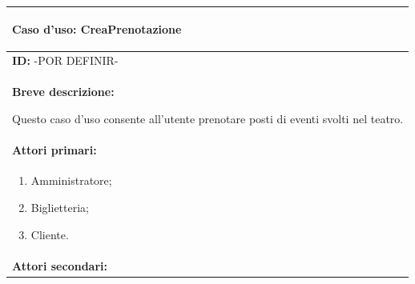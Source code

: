 \documentclass{article}
\begin{document}
                \begin{table}[t]
                    \centering
                    \begin{tabular}{|p{\linewidth}|}
                        \hline
                        \cellcolor{gray!100}
                        \color{white}
                        \begin{center}
                            \textbf{Caso d'uso:} CreaPrenotazione
                        \end{center} \\
                        \hline
                        \textbf{ID:} -POR DEFINIR- \\
                        \hline
                        \cellcolor{gray!20}
                        \textbf{Breve descrizione:} 
                            
                        Questo caso d'uso consente all'utente prenotare posti di eventi svolti nel teatro. \\
                        \hline
                        \textbf{Attori primari:} \\
                        \begin{minipage}{\linewidth}
                            \begin{enumerate}[noitemsep]
                                \item Amministratore;
                                \item Biglietteria;
                                \item Cliente.
                            \end{enumerate}
                        \end{minipage}
                        \vspace{0pt} \\  %
                        \hline
                        \textbf{Attori secondari:}
                        

\end{tabular}
\end{table}
\end{document}
